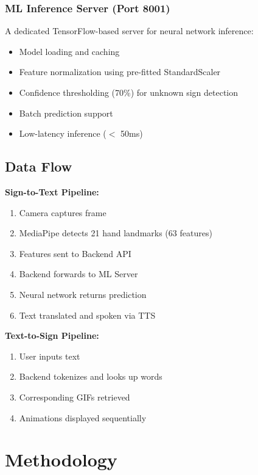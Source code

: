 \documentclass[conference]{IEEEtran}
\begin{document}
\subsubsection{ML Inference Server (Port 8001)}

A dedicated TensorFlow-based server for neural network inference:

\begin{itemize}
    \item Model loading and caching
    \item Feature normalization using pre-fitted StandardScaler
    \item Confidence thresholding (70\%) for unknown sign detection
    \item Batch prediction support
    \item Low-latency inference ($<$ 50ms)
\end{itemize}

\subsection{Data Flow}

\textbf{Sign-to-Text Pipeline:}
\begin{enumerate}
    \item Camera captures frame
    \item MediaPipe detects 21 hand landmarks (63 features)
    \item Features sent to Backend API
    \item Backend forwards to ML Server
    \item Neural network returns prediction
    \item Text translated and spoken via TTS
\end{enumerate}

\textbf{Text-to-Sign Pipeline:}
\begin{enumerate}
    \item User inputs text
    \item Backend tokenizes and looks up words
    \item Corresponding GIFs retrieved
    \item Animations displayed sequentially
\end{enumerate}

\section{Methodology}
\end{document}
